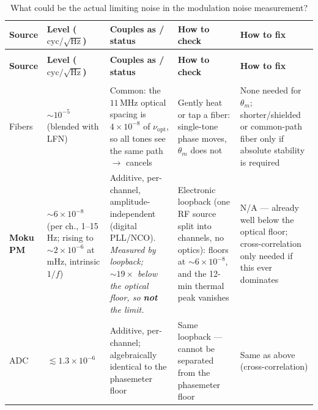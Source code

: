 \documentclass[11pt]{article}
\begin{document}
\begin{landscape}
\begin{footnotesize}
\begin{longtable}{
    >{\raggedright\arraybackslash}p{2.2cm}
    >{\raggedright\arraybackslash}p{3.2cm}
    >{\raggedright\arraybackslash}p{5cm}
    >{\raggedright\arraybackslash}p{6.3cm}
    >{\raggedright\arraybackslash}p{6.3cm}
}
\caption{What could be the actual limiting noise in the modulation noise measurement?}
\label{tab:meas_noise_budget}\\
\toprule
\textbf{Source} & \textbf{Level ($\mathrm{cyc}/\sqrt{\mathrm{Hz}}$)} &
\textbf{Couples as / status} & \textbf{How to check} & \textbf{How to fix} \\
\midrule
\endfirsthead
\multicolumn{5}{l}{\small\textit{Table~\ref{tab:meas_noise_budget} continued\ldots}}\\
\toprule
\textbf{Source} & \textbf{Level ($\mathrm{cyc}/\sqrt{\mathrm{Hz}}$)} &
\textbf{Couples as / status} & \textbf{How to check} & \textbf{How to fix} \\
\midrule
\endhead
\midrule
\multicolumn{5}{r}{\small\textit{Continued\ldots}}\\
\endfoot
\bottomrule
\endlastfoot


Fibers
  & $\sim\!10^{-5}$ (blended with LFN)
  & Common: the $11\,$MHz optical spacing is $4\times10^{-8}$ of $\nu_{\mathrm{opt}}$, so all tones see the same path $\rightarrow$ cancels
  & Gently heat or tap a fiber: single-tone phase moves, $\theta_m$ does not
  & None needed for $\theta_m$; shorter/shielded or common-path fiber only if absolute stability is required \\[3pt]

\rowcolor{rowB}
\textbf{Moku PM}
  & $\sim\!6\times10^{-8}$ (per ch., 1--15\,Hz; rising to $\sim\!2\times10^{-6}$ at mHz, intrinsic $1/f$)
  & Additive, per-channel, amplitude-independent (digital PLL/NCO). \emph{Measured by loopback; $\sim\!19\times$ below the optical floor, so \textbf{not} the limit.}
  & Electronic loopback (one RF source split into channels, no optics): floors at $\sim\!6\times10^{-8}$, and the 12-min thermal peak vanishes
  & N/A --- already well below the optical floor; cross-correlation only needed if this ever dominates \\[3pt]

ADC
  & $\lesssim 1.3\times10^{-6}$
  & Additive, per-channel; algebraically identical to the phasemeter floor
  & Same loopback --- cannot be separated from the phasemeter floor
  & Same as above (cross-correlation) \\[3pt]


\end{longtable}
\end{footnotesize}
\end{landscape}
\end{document}
